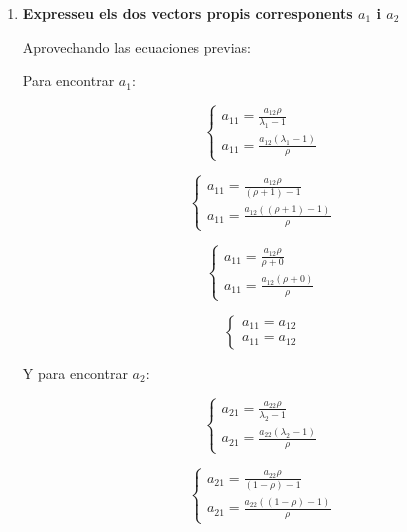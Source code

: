 \documentclass[a4paper,10pt]{article}
\begin{document}
\begin{enumerate}
  \item \textbf{Expresseu els dos vectors propis corresponents $a_1$ i $a_2$}

  Aprovechando las ecuaciones previas:

  Para encontrar $a_1$:

  \begin{equation*}
    \begin{cases}
      a_{11} = \frac{a_{12}\rho}{\lambda_1 - 1} \\
      a_{11} = \frac{a_{12}(\lambda_1 - 1)}{\rho}
    \end{cases}
  \end{equation*}

  \begin{equation*}
    \begin{cases}
      a_{11} = \frac{a_{12}\rho}{(\rho + 1) - 1} \\
      a_{11} = \frac{a_{12}((\rho + 1) - 1)}{\rho}
    \end{cases}
  \end{equation*}

  \begin{equation*}
    \begin{cases}
      a_{11} = \frac{a_{12}\rho}{\rho + 0} \\
      a_{11} = \frac{a_{12}(\rho + 0)}{\rho}
    \end{cases}
  \end{equation*}

  \begin{equation*}
    \begin{cases}
      a_{11} = a_{12} \\
      a_{11} = a_{12}
    \end{cases}
  \end{equation*}

  Y para encontrar $a_2$:

  \begin{equation*}
    \begin{cases}
      a_{21} = \frac{a_{22}\rho}{\lambda_2 - 1} \\
      a_{21} = \frac{a_{22}(\lambda_2 - 1)}{\rho}
    \end{cases}
  \end{equation*}

  \begin{equation*}
    \begin{cases}
      a_{21} = \frac{a_{22}\rho}{(1 - \rho) - 1} \\
      a_{21} = \frac{a_{22}((1 - \rho) - 1)}{\rho}
    \end{cases}
  \end{equation*}


\end{enumerate}
\end{document}
